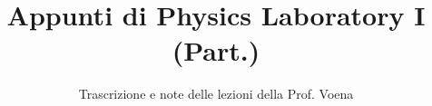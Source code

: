 \documentclass[a4paper,12pt]{article}
\title{Appunti di Physics Laboratory I (Part.)}
\author{Trascrizione e note delle lezioni della Prof. Voena}
\date{}
\begin{document}
\maketitle
\projectintro
\tableofcontents
\newpage

\end{document}
